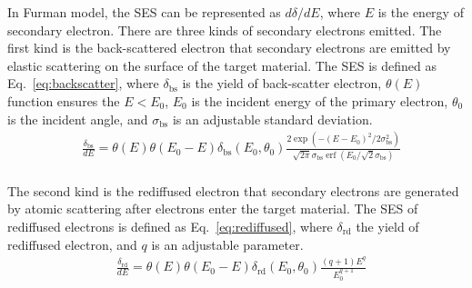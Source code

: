 In Furman model, the SES can be represented as $d\delta/dE$,
where $E$ is the energy of secondary electron.
There are three kinds of secondary electrons emitted.
The first kind is the back-scattered electron that secondary electrons are emitted by elastic scattering on the surface of the target material.
The SES is defined as Eq.~\eqref{eq:backscatter},
where $\delta_{\mathrm{bs}}$ is the yield of back-scatter electron,
$\theta(E)$ function ensures the $E<E_0$,
$E_0$ is the incident energy of the primary electron,
$\theta_0$ is the incident angle,
and $\sigma_{\mathrm{bs}}$ is an adjustable standard deviation.
\begin{equation}
    \label{eq:backscatter}
    \begin{aligned}
         & \frac{\delta_{\mathrm{bs}}}{dE} =\theta(E) \theta\left(E_0-E\right) \delta_{\mathrm{bs}}\left(E_0, \theta_0\right)
        \frac{2 \exp \left(-\left(E-E_0\right)^2 / 2 \sigma_{\mathrm{bs}}^2\right)}{\sqrt{2 \pi} \sigma_{\mathrm{bs}}
        \operatorname{erf}\left(E_0 / \sqrt{2} \sigma_{\mathrm{bs}}\right)}                                                   \\
    \end{aligned}
\end{equation}

The second kind is the rediffused electron that secondary electrons are generated by atomic scattering after electrons enter the target material.
The SES of rediffused electrons is defined as Eq.~\eqref{eq:rediffused},
where $\delta_{\mathrm{rd}}$ the yield of rediffused electron,
and $q$ is an adjustable parameter.
\begin{equation}
    \label{eq:rediffused}
    \begin{aligned}
         & \frac{\delta_{\mathrm{rd}}}{dE} =\theta(E) \theta\left(E_0-E\right) \delta_{\mathrm{rd}}\left(E_0, \theta_0\right) \frac{(q+1) E^q}{E_0^{q+1}} \\
    \end{aligned}
\end{equation}

